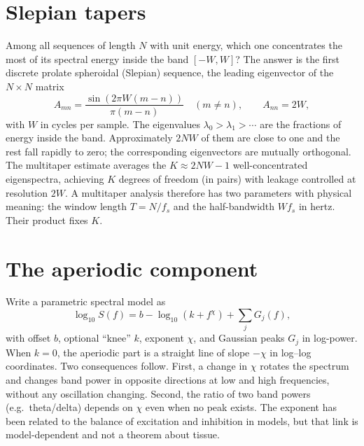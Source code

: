 \section{Slepian tapers}
Among all sequences of length $N$ with unit energy, which one concentrates the most of its spectral energy inside the band $[-W,W]$? The answer is the first discrete prolate spheroidal (Slepian) sequence, the leading eigenvector of the $N\times N$ matrix
\[
A_{mn}=\frac{\sin(2\pi W(m-n))}{\pi(m-n)}\quad(m\ne n),\qquad A_{nn}=2W,
\]
with $W$ in cycles per sample. The eigenvalues $\lambda_0>\lambda_1>\cdots$ are the fractions of energy inside the band. Approximately $2NW$ of them are close to one and the rest fall rapidly to zero; the corresponding eigenvectors are mutually orthogonal. The multitaper estimate averages the $K\approx2NW-1$ well-concentrated eigenspectra, achieving $K$ degrees of freedom (in pairs) with leakage controlled at resolution $2W$. A multitaper analysis therefore has two parameters with physical meaning: the window length $T=N/f_s$ and the half-bandwidth $Wf_s$ in hertz. Their product fixes $K$.

\section{The aperiodic component}
Write a parametric spectral model as
\[
\log_{10}S(f)=b-\log_{10}(k+f^\chi)+\sum_jG_j(f),
\]
with offset $b$, optional ``knee'' $k$, exponent $\chi$, and Gaussian peaks $G_j$ in log-power. When $k=0$, the aperiodic part is a straight line of slope $-\chi$ in log--log coordinates. Two consequences follow. First, a change in $\chi$ rotates the spectrum and changes band power in opposite directions at low and high frequencies, without any oscillation changing. Second, the ratio of two band powers (e.g.\ theta/delta) depends on $\chi$ even when no peak exists. The exponent has been related to the balance of excitation and inhibition in models, but that link is model-dependent and not a theorem about tissue.

